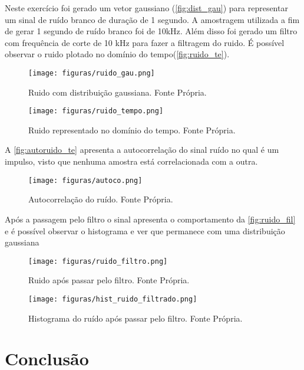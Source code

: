 \documentclass[11pt]{classes/ifscarticle}
\begin{document}
Neste exercício foi gerado um vetor gaussiano (\autoref{fig:dist_gau}) para representar um sinal de ruído branco de duração de 1 segundo. A amostragem utilizada a fim de gerar 1 segundo de ruído branco foi de 10kHz.
Além disso foi gerado um filtro com frequência de corte de 10 kHz para fazer a filtragem do ruido.
É possível observar o ruido plotado no domínio do tempo(\autoref{fig:ruido_te}). 

\begin{figure}[ht]
    \centering
    \texttt{[image: figuras/ruido\_gau.png]}
    \caption{Ruido com distribuição gaussiana. Fonte Própria.}
    \label{fig:dist_gau}
\end{figure}

\begin{figure}[ht]
    \centering
    \texttt{[image: figuras/ruido\_tempo.png]}
    \caption{Ruido representado no domínio do tempo. Fonte Própria.}
    \label{fig:ruido_te}
\end{figure}

A \autoref{fig:autoruido_te} apresenta a autocorrelação do sinal ruído no qual é um impulso, visto que nenhuma amostra está correlacionada com a outra.

\begin{figure}[ht]
    \centering
    \texttt{[image: figuras/autoco.png]}
    \caption{Autocorrelação do ruído. Fonte Própria.}
    \label{fig:autoruido_te}
\end{figure}

\newpage

Após a passagem pelo filtro o sinal apresenta o comportamento da \autoref{fig:ruido_fil} e é possível observar o histograma e ver que permanece com uma distribuição gaussiana

\newpage
\begin{figure}[ht]
    \centering
    \texttt{[image: figuras/ruido\_filtro.png]}
    \caption{Ruido após passar pelo filtro. Fonte Própria.}
    \label{fig:ruido_fil}
\end{figure}

\begin{figure}[ht]
    \centering
    \texttt{[image: figuras/hist\_ruido\_filtrado.png]}
    \caption{Histograma do ruído após passar pelo filtro. Fonte Própria.}
    \label{fig:hist_ruido}
\end{figure}

\newpage
\section{Conclusão}
\label{sec:conclusão}
\end{document}
